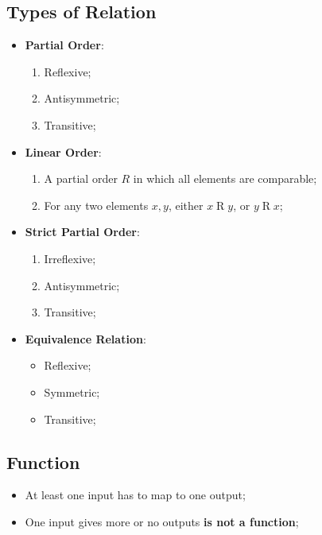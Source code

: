 \documentclass[letterpaper, 11pt]{article}
\begin{document}
    \subsection{Types of Relation}
      \begin{itemize}
        \item \textbf{Partial Order}:
        \begin{enumerate}
          \item Reflexive;
          \item Antisymmetric;
          \item Transitive;
        \end{enumerate}
        \item \textbf{Linear Order}:
        \begin{enumerate}
          \item A partial order $ R $ in which all elements are comparable;
          \item For any two elements $ x, y $, either $ x \mathrel{R} y $,
          or $ y \mathrel{R} x $;
        \end{enumerate}
        \item \textbf{Strict Partial Order}:
        \begin{enumerate}
          \item Irreflexive;
          \item Antisymmetric;
          \item Transitive;
        \end{enumerate}
        \item \textbf{Equivalence Relation}:
        \begin{itemize}
          \item Reflexive;
          \item Symmetric;
          \item Transitive;
        \end{itemize}
      \end{itemize}
    
    \subsection{Function}
    
      \begin{itemize}
        \item At least one input has to map to one output;
        \item One input gives more or no outputs \textbf{is not a function};
      \end{itemize}
    
\end{document}
